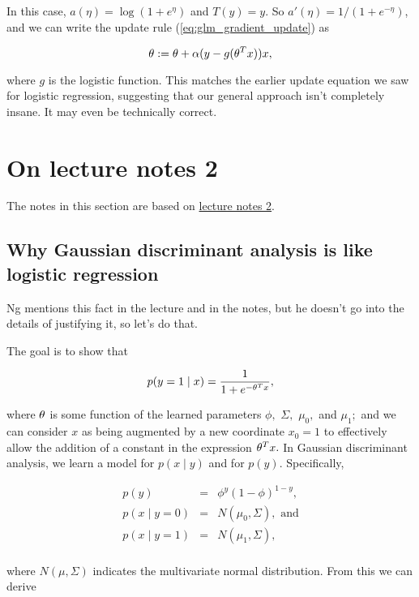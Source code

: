 \documentclass[]{article}
\begin{document}
In this case, \(a(\eta) = \log(1 + e^\eta)\) and \(T(y)=y\). So
\(a'(\eta) = 1/(1+e^{-\eta})\), and we can write the update rule
(\ref{eq:glm_gradient_update}) as

\[\theta := \theta + \alpha(y - g(\theta^Tx))x,\]

where \(g\) is the logistic function. This matches the earlier update
equation we saw for logistic regression, suggesting that our general
approach isn't completely insane. It may even be technically correct.

\section{On lecture notes 2}\label{on-lecture-notes-2}

The notes in this section are based on
\href{http://cs229.stanford.edu/notes/cs229-notes2.pdf}{lecture notes
2}.

\subsection{Why Gaussian discriminant analysis is like logistic
regression}\label{why-gaussian-discriminant-analysis-is-like-logistic-regression}

Ng mentions this fact in the lecture and in the notes, but he doesn't go
into the details of justifying it, so let's do that.

The goal is to show that

\begin{equation}p(y=1\mid x) = \frac{1}{1+e^{-\theta^T x}},\label{eq:gda_goal}\end{equation}

where \(\theta\) is some function of the learned parameters \(\phi,\)
\(\Sigma,\) \(\mu_0,\) and \(\mu_1;\) and we can consider \(x\) as being
augmented by a new coordinate \(x_0=1\) to effectively allow the
addition of a constant in the expression \(\theta^Tx.\) In Gaussian
discriminant analysis, we learn a model for \(p(x\mid y)\) and for
\(p(y).\) Specifically,

\[\begin{array}{rcl}
p(y) & = & \phi^y(1-\phi)^{1-y}, \\
p(x\mid y=0) & = & N(\mu_0, \Sigma), \text{ and} \\
p(x\mid y=1) & = & N(\mu_1, \Sigma), \\
\end{array}\]

where \(N(\mu,\Sigma)\) indicates the multivariate normal distribution.
From this we can derive
\end{document}
